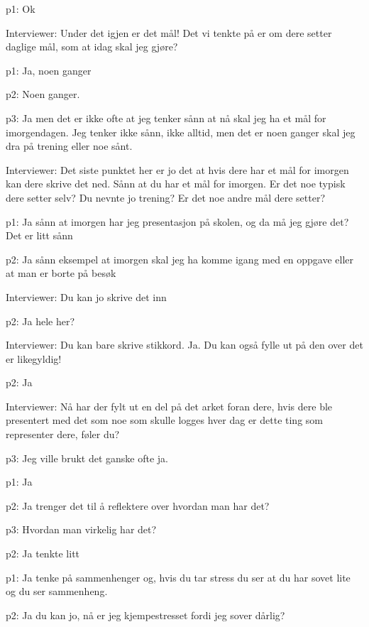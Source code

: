 \documentclass[11pt, norsk, a4paper]{article}
\begin{document}
\textcolor{myGreen} {p1: }Ok


\textcolor{myBlue} {Interviewer: }Under det igjen er det mål! Det vi tenkte på er om dere setter daglige mål, som at idag skal jeg gjøre?


\textcolor{myGreen} {p1: }Ja, noen ganger


\textcolor{myYellow} {p2: }Noen ganger. 


\textcolor{myR} {p3: }Ja men det er ikke ofte at jeg tenker sånn at nå skal jeg ha et mål for imorgendagen. Jeg tenker ikke sånn, ikke alltid, men det er noen ganger skal jeg dra på trening eller noe sånt.


\textcolor{myBlue} {Interviewer: }Det siste punktet her er jo det at hvis dere har et mål for imorgen kan dere skrive det ned. Sånn at du har et mål for imorgen. Er det noe typisk dere setter selv? Du nevnte jo trening? Er det noe andre mål dere setter?


\textcolor{myGreen} {p1: }Ja sånn at imorgen har jeg presentasjon på skolen, og da må jeg gjøre det? Det er litt sånn


\textcolor{myYellow} {p2: }Ja sånn eksempel at imorgen skal jeg ha komme igang med en oppgave eller at man er borte på besøk


\textcolor{myBlue} {Interviewer: }Du kan jo skrive det inn


\textcolor{myYellow} {p2: }Ja hele her?


\textcolor{myBlue} {Interviewer: }Du kan bare skrive stikkord. Ja. Du kan også fylle ut på den over det er likegyldig!


\textcolor{myYellow} {p2: }Ja


\textcolor{myBlue} {Interviewer: }Nå har der fylt ut en del på det arket foran dere, hvis dere ble presentert med det som noe som skulle logges hver dag er dette ting som representer dere, føler du?


\textcolor{myR} {p3: }Jeg ville brukt det ganske ofte ja.


\textcolor{myGreen} {p1: }Ja


\textcolor{myYellow} {p2: }Ja trenger det til å reflektere over hvordan man har det?


\textcolor{myR} {p3: }Hvordan man virkelig har det?


\textcolor{myYellow} {p2: }Ja tenkte litt


\textcolor{myGreen} {p1: }Ja tenke på sammenhenger og, hvis du tar stress du ser at du har sovet lite og du ser sammenheng.


\textcolor{myYellow} {p2: }Ja du kan jo, nå er jeg kjempestresset fordi jeg sover dårlig?
\end{document}
